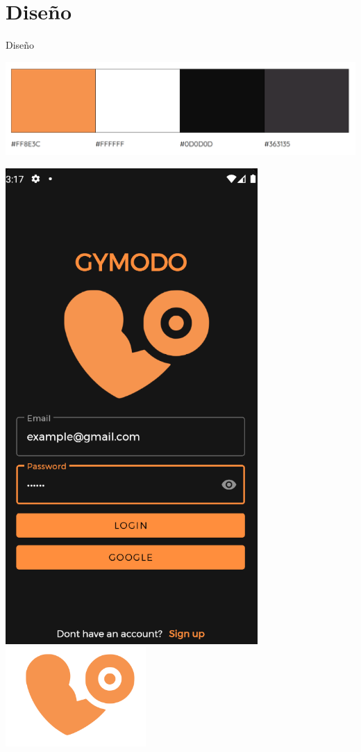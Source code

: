 \documentclass[12pt]{beamer}
\begin{document}
\section{Diseño}
\begin{frame}{Diseño}

\begin{center}
\includegraphics[width=\textwidth]{color_palette}

\includegraphics[height=0.45\textheight]{loginconcredenciales}
\includegraphics[width=0.4\textwidth]{gymodo_logo}
\end{center}


\end{frame}
\end{document}
